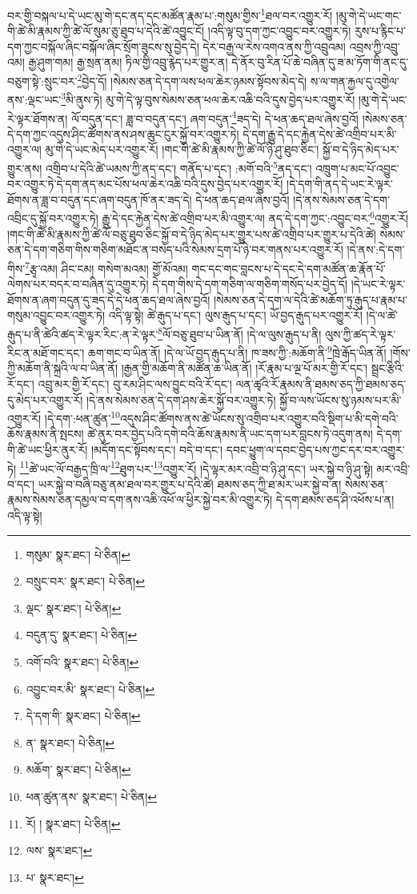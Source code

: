 བར་གྱི་བསྐལ་པ་དེ་ཡང་མུ་གེ་དང་ནད་དང་མཚོན་རྣམ་པ་:གསུམ་གྱིས་\footnote{གསུམ་  སྣར་ཐང་།  པེ་ཅིན། }ཐལ་བར་འགྱུར་རོ། །མུ་གེ་དེ་ཡང་གང་གི་ཚེ་མི་རྣམས་ཀྱི་ཚེ་ལོ་སུམ་ཅུ་ཐུབ་པ་དེའི་ཚེ་འབྱུང་ངོ། །འདི་ལྟ་བུ་དག་ཀྱང་འབྱུང་བར་འགྱུར་ཏེ། རུས་པ་རྙིང་པ་དག་ཀྱང་བསྐོལ་ཞིང་བསྐོལ་ཞིང་སྲོག་ཟུངས་སུ་བྱེད་དེ། དེར་བརྒྱ་ལ་རེས་འགའ་ནས་ཀྱི་འབྲུའམ། འབྲས་ཀྱི་འབྲུ་འམ། རྒྱ་ཤུག་གམ། རྒྱ་སྲན་ནམ། ཏིལ་གྱི་འབྲུ་རྙེད་པར་གྱུར་ན། དེ་ནོར་བུ་རིན་པོ་ཆེ་བཞིན་དུ་ཟ་མ་ཏོག་གི་ནང་དུ་བཅུག་སྟེ་:སྲུང་བར་\footnote{བསྲུང་བར་  སྣར་ཐང་།  པེ་ཅིན། }བྱེད་དོ། །སེམས་ཅན་དེ་དག་ལས་ཕལ་ཆེར་ཉམས་སྟོབས་མེད་དེ། ས་ལ་གན་རྐྱལ་དུ་འགྱེལ་ནས་:ལྡང་ཡང་\footnote{ལྡང་  སྣར་ཐང་།  པེ་ཅིན། }མི་ནུས་ཏེ། མུ་གེ་དེ་ལྟ་བུས་སེམས་ཅན་ཕལ་ཆེར་འཆི་བའི་དུས་བྱེད་པར་འགྱུར་རོ། །མུ་གེ་དེ་ཡང་རེ་ལྟར་ཐོགས་ན། ལོ་བདུན་དང་། ཟླ་བ་བདུན་དང་། ཞག་བདུན་\footnote{བདུན་དུ་  སྣར་ཐང་།  པེ་ཅིན། }ཟད་དེ། དེ་ཕན་ཆད་ཐལ་ཞེས་བྱའོ། །སེམས་ཅན་དེ་དག་ཀྱང་འདུས་ཤིང་ཚོགས་ནས་ཤས་ཆུང་ངུར་སྐྱོ་བར་འགྱུར་ཏེ། དེ་དག་རྒྱུ་དེ་དང་རྐྱེན་དེས་ཚེ་འགྲིབ་པར་མི་འགྱུར་ལ། མུ་གེ་དེ་ཡང་མེད་པར་འགྱུར་རོ། །གང་གི་ཚེ་མི་རྣམས་ཀྱི་ཚེ་ལོ་ཉི་ཤུ་ཐུབ་ཅིང་། སྐྱོ་བ་དེ་ཉིད་མེད་པར་གྱུར་ནས། འགྲིབ་པ་དེའི་ཚེ་ཡམས་ཀྱི་ནད་དང་། གནོད་པ་དང་། :མགོ་བའི་\footnote{འགོ་བའི་  སྣར་ཐང་།  པེ་ཅིན། }ནད་དང་། འཁྲུག་པ་མང་པོ་འབྱུང་བར་འགྱུར་ཏེ་དེ་དག་ནད་མང་པོས་ཕལ་ཆེར་འཆི་བའི་དུས་བྱེད་པར་འགྱུར་རོ། །དེ་དག་གི་ནད་དེ་ཡང་རེ་ལྟར་ཐོགས་ན་ཟླ་བ་བདུན་དང་ཞག་བདུན་ཁོ་ནར་ཟད་དེ། དེ་ཕན་ཆད་ཐལ་ཞེས་བྱའོ། །དེ་ནས་སེམས་ཅན་དེ་དག་འབྲིང་དུ་སྐྱོ་བར་འགྱུར་ཏེ། རྒྱུ་དེ་དང་རྐྱེན་དེས་ཚེ་འགྲིབ་པར་མི་འགྱུར་ལ། ནད་དེ་དག་ཀྱང་:འབྱུང་བར་\footnote{འབྱུང་བར་མི་  སྣར་ཐང་།  པེ་ཅིན། }འགྱུར་རོ། །གང་གི་ཚེ་མི་རྣམས་ཀྱི་ཚེ་ལོ་བཅུ་ཐུབ་ཅིང་སྐྱོ་བ་དེ་ཉིད་མེད་པར་གྱུར་པས་ཚེ་འགྲིབ་པར་གྱུར་པ་དེའི་ཚེ། སེམས་ཅན་དེ་དག་གཅིག་གིས་གཅིག་མཐོང་ན་བསད་པའི་སེམས་དྲག་པོ་ཉེ་བར་གནས་པར་འགྱུར་རོ། །དེ་ནས་:དེ་དག་གིས་\footnote{དེ་དག་གི་  སྣར་ཐང་།  པེ་ཅིན། }རྩྭ་འམ། ཤིང་ངམ། གསེག་མའམ། གྱོ་མོའམ། གང་དང་གང་བླངས་པ་དེ་དང་དེ་དག་མཚོན་ཆ་རྣོན་པོ་ལེགས་པར་བདར་བ་བཞིན་དུ་འགྱུར་ཏེ། དེ་དག་གིས་དེ་དག་གཅིག་ལ་གཅིག་གསོད་པར་བྱེད་དོ། །དེ་ཡང་རེ་ལྟར་ཐོགས་ན་ཞག་བདུན་དུ་ཟད་དེ་དེ་ཕན་ཆད་ཐལ་ཞེས་བྱའོ། །སེམས་ཅན་དེ་དག་ལ་དེའི་ཚེ་མཆོག་ཏུ་རྒུད་པ་རྣམ་པ་གསུམ་འབྱུང་བར་འགྱུར་ཏེ། འདི་ལྟ་སྟེ། ཚེ་རྒུད་པ་དང་། ལུས་རྒུད་པ་དང་། ཡོ་བྱད་རྒུད་པར་འགྱུར་རོ། །དེ་ལ་ཚེ་རྒུད་པ་ནི་ཚེའི་ཚད་རེ་ལྟར་རིང་:ན་རེ་ལྟར་\footnote{ན་  སྣར་ཐང་།  པེ་ཅིན། }ལོ་བཅུ་ཐུབ་པ་ཡིན་ནོ། །དེ་ལ་ལུས་རྒུད་པ་ནི། ལུས་ཀྱི་ཚད་རེ་ལྟར་རིང་ན་མཐོ་གང་དང་། ཆག་གང་བ་ཡིན་ནོ། །དེ་ལ་ཡོ་བྱད་རྒུད་པ་ནི། ཁ་ཟས་ཀྱི་:མཆོག་ནི་\footnote{མཆོག་  སྣར་ཐང་།  པེ་ཅིན། }ཁྲེ་རྒོད་ཡིན་ནོ། །གོས་ཀྱི་མཆོག་ནི་སྐྲའི་ལ་བ་ཡིན་ནོ། །རྒྱན་གྱི་མཆོག་ནི་མཚོན་ཆ་ཡིན་ནོ། །རོ་རྣམ་པ་ལྔ་པོ་མར་གྱི་རོ་དང་། སྦྲང་རྩིའི་རོ་དང་། འབྲུ་མར་གྱི་རོ་དང་། བུ་རམ་ཤིང་ལས་བྱུང་བའི་རོ་དང་། ལན་ཚྭའི་རོ་རྣམས་ནི་ཐམས་ཅད་ཀྱི་ཐམས་ཅད་དུ་མེད་པར་འགྱུར་རོ། །དེ་ནས་སེམས་ཅན་དེ་དག་ཤས་ཆེར་སྐྱོ་བར་འགྱུར་ཏེ། སྐྱོ་བ་ལས་ཡོངས་སུ་ཉམས་པར་མི་འགྱུར་རོ། །དེ་དག་:ཕན་ཚུན་\footnote{ཕན་ཚུན་ནས་  སྣར་ཐང་།  པེ་ཅིན། }འདུས་ཤིང་ཚོགས་ནས་ཚེ་ཡོངས་སུ་འགྲིབ་པར་འགྱུར་བའི་སྡིག་པ་མི་དགེ་བའི་ཆོས་རྣམས་ནི་སྤངས། ཚེ་ནུར་བར་བྱེད་པའི་དགེ་བའི་ཆོས་རྣམས་ནི་ཡང་དག་པར་བླངས་ཏེ་འདུག་ནས། དེ་དག་གི་ཚེ་ཡང་ཕྱིར་ནུར་རོ། །མདོག་དང་སྟོབས་དང་། བདེ་བ་དང་། དབང་ཕྱུག་ལ་དབང་བྱེད་པས་ཀྱང་དར་བར་འགྱུར་ཏེ། \footnote{རོ། །   སྣར་ཐང་།  པེ་ཅིན། }ཚེ་ཡང་ལོ་བརྒྱད་ཁྲི་ལ་\footnote{ལས་  སྣར་ཐང་། }ཐུག་པར་\footnote{པ་  སྣར་ཐང་། }འགྱུར་རོ། །དེ་ལྟར་མར་འབྲི་བ་ཉི་ཤུ་དང་། ཡར་སྐྱེ་བ་ཉི་ཤུ་སྟེ། མར་འབྲི་བ་དང་། ཡར་སྐྱེ་བ་བཞི་བཅུ་ནམ་ཐལ་བར་གྱུར་པ་དེའི་ཚེ། ཐམས་ཅད་ཀྱི་ཐ་མར་ཡར་སྐྱེ་བ་ན། སེམས་ཅན་རྣམས་སེམས་ཅན་དམྱལ་བ་དག་ནས་འཆི་འཕོ་ལ་ཕྱིར་སྐྱེ་བར་མི་འགྱུར་ཏེ། དེ་དག་ཐམས་ཅད་ཤི་འཕོས་པ་ན། འདི་ལྟ་སྟེ། 